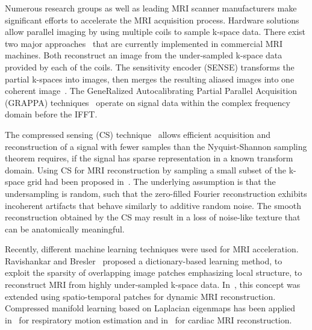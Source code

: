 \documentclass[10pt,journal,compsoc]{IEEEtran}
\begin{document}
Numerous research groups as well as leading MRI scanner manufacturers make significant efforts to accelerate the MRI acquisition process. Hardware solutions allow parallel imaging by using multiple coils \cite{roemer1990nmr} to sample k-space data. There exist two major approaches~\cite{Deshmane2012} that are currently implemented in commercial MRI machines. Both reconstruct an image from the under-sampled k-space data provided by each of the coils. The sensitivity encoder (SENSE) transforms the partial k-spaces into images, then merges the resulting aliased images into one coherent image~\cite{pruessmann1999sense}. 
The GeneRalized Autocalibrating Partial Parallel Acquisition (GRAPPA) techniques~\cite{griswold2002generalized} operate on signal data within the complex frequency domain before the IFFT.

The compressed sensing (CS) technique~\cite{donoho2006compressed} allows efficient acquisition and reconstruction of a signal with fewer samples than the Nyquist-Shannon sampling theorem requires, if the signal has sparse representation in a known transform domain. Using CS for MRI reconstruction by sampling a small subset of the k-space grid had been proposed in~\cite{lustig2007sparse}. The underlying assumption is that the undersampling is random, such that the zero-filled Fourier reconstruction exhibits incoherent artifacts that behave similarly to additive random noise. 
The smooth reconstruction obtained by the CS may result in a loss of noise-like texture that can be anatomically meaningful.
 
Recently, different machine learning techniques were used for MRI acceleration. 
Ravishankar and Bresler~\cite{ravishankar2011mr} proposed a dictionary-based learning method, to exploit the sparsity of overlapping image patches emphasizing local structure, to reconstruct MRI from highly under-sampled k-space data. In~\cite{caballero2014dictionary}, this concept was extended using spatio-temporal patches for dynamic MRI reconstruction.
Compressed manifold learning based on Laplacian eigenmaps has been applied in~\cite{usman2014compressive} for respiratory motion estimation and in~\cite{bhatia2015fast} for cardiac MRI reconstruction.
\end{document}
